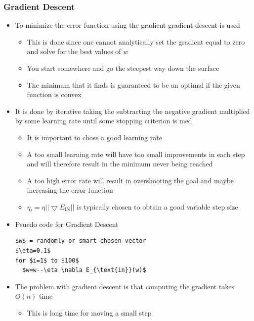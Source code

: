 \documentclass[a4, english]{article}
\begin{document}
\subsubsection{Gradient Descent}
\begin{itemize}
	\item To minimize the error function using the gradient gradient descent is used
  \begin{itemize}
  	\item This is done since one cannot analytically set the gradient equal to zero and solve for the best values of $w$ 
  	\item You start somewhere and go the steepest way down the surface
    \item The minimum that it finds is guaranteed to be an optimal if the given function is convex  
  \end{itemize}
  \item It is done by iterative taking the subtracting the negative gradient multiplied by some learning rate until some stopping criterion is med
  \begin{itemize}
  	\item It is important to chose a good learning rate 
    \item A too small learning rate will have too small improvements in each step and will therefore result in the minimum never being reached
    \item A too high error rate will result in overshooting the goal and maybe increasing the error function
    \item $\eta_t = \eta || \bigtriangledown E_\text{IN} ||$ is typically chosen to obtain a good variable step size   
  \end{itemize}
  \item Psuedo code for Gradient Descent
\begin{lstlisting}[mathescape=true, keywordstyle=\ttfamily]
$w$ = randomly or smart chosen vector
$\eta=0.1$ 
for $i=1$ to $100$ 
  $w=w--\eta \nabla E_{\text{in}}(w)$
\end{lstlisting} 
  \item The problem with gradient descent is that computing the gradient takes $O(n)$ time 
  \begin{itemize}
  	\item This is long time for moving a small step
  \end{itemize}
\end{itemize}
\end{document}
